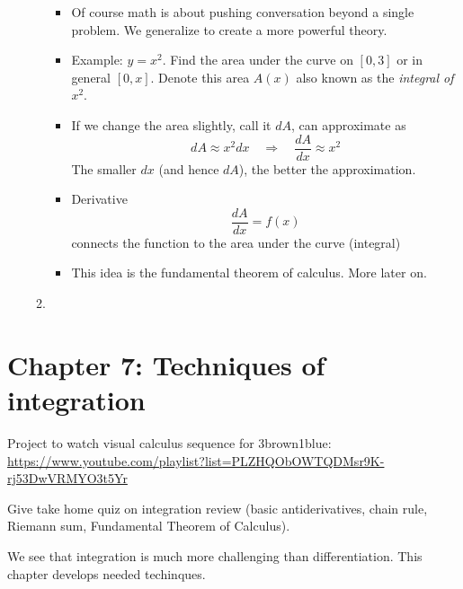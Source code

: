 \documentclass{article}
\begin{document}
\begin{enumerate}
\begin{enumerate}
\begin{itemize}
\item Of course math is about pushing conversation beyond a single problem. We generalize to create a more powerful theory.
\item Example: $y=x^2$. Find the area under the curve on $[0,3]$ or in general $[0,x]$. Denote this area $A(x)$ also known as the \emph{integral of $x^2$}.
\item If we change the area slightly, call it $dA$, can approximate as
\[
dA \approx x^2 dx \quad \Rightarrow \quad \frac{dA}{dx} \approx x^2
\]
The smaller $dx$ (and hence $dA$), the better the approximation.
\item Derivative
\[
\frac{dA}{dx} = f(x)
\]
connects the function to the area under the curve (integral)
\item This idea is the fundamental theorem of calculus. More later on.
\end{itemize}
\item 
\end{enumerate}
\end{enumerate}

\section{Chapter 7: Techniques of integration} 

Project to watch visual calculus sequence for 3brown1blue: \url{https://www.youtube.com/playlist?list=PLZHQObOWTQDMsr9K-rj53DwVRMYO3t5Yr}

Give take home quiz on integration review (basic antiderivatives, chain rule, Riemann sum, Fundamental Theorem of Calculus).

We see that integration is much more challenging than differentiation. This chapter develops needed techinques.

\end{document}
